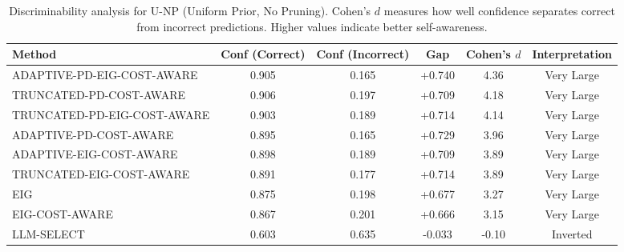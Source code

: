 \begin{table}[htbp]
\centering
\small
\caption{Discriminability analysis for U-NP (Uniform Prior, No Pruning). Cohen's $d$ measures how well confidence separates correct from incorrect predictions. Higher values indicate better self-awareness.}
\label{tab:discriminability-notprune_uniform}
\begin{tabular}{@{}lccccc@{}}
\toprule
Method & Conf (Correct) & Conf (Incorrect) & Gap & Cohen's $d$ & Interpretation \\
\midrule
ADAPTIVE-PD-EIG-COST-AWARE & 0.905 & 0.165 & +0.740 & 4.36 & Very Large \\
TRUNCATED-PD-COST-AWARE & 0.906 & 0.197 & +0.709 & 4.18 & Very Large \\
TRUNCATED-PD-EIG-COST-AWARE & 0.903 & 0.189 & +0.714 & 4.14 & Very Large \\
ADAPTIVE-PD-COST-AWARE & 0.895 & 0.165 & +0.729 & 3.96 & Very Large \\
ADAPTIVE-EIG-COST-AWARE & 0.898 & 0.189 & +0.709 & 3.89 & Very Large \\
TRUNCATED-EIG-COST-AWARE & 0.891 & 0.177 & +0.714 & 3.89 & Very Large \\
EIG & 0.875 & 0.198 & +0.677 & 3.27 & Very Large \\
EIG-COST-AWARE & 0.867 & 0.201 & +0.666 & 3.15 & Very Large \\
LLM-SELECT & 0.603 & 0.635 & -0.033 & -0.10 & Inverted \\
\bottomrule
\end{tabular}
\end{table}